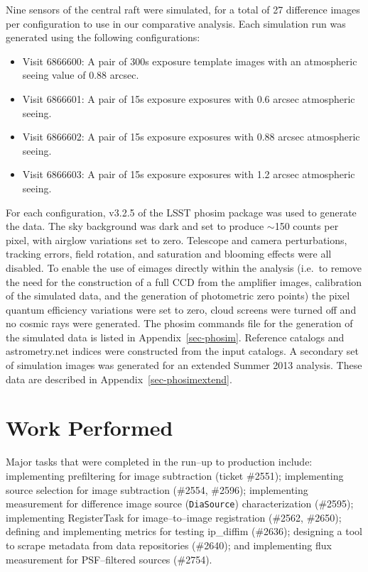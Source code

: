 \documentclass[prd, nofootinbib, floatfix, 11pt,tightenlines,times]{article}
\begin{document}
Nine sensors of the central raft were simulated, for a total of 27
difference images per configuration to use in our comparative
analysis.  Each simulation run was generated using the following
configurations:
\begin{itemize}
\item Visit 6866600: A pair of 300s exposure template images with
  an atmospheric seeing value of 0.88 arcsec.
\item Visit 6866601: A pair of 15s exposure exposures with 0.6
 arcsec atmospheric seeing.
\item Visit 6866602: A pair of 15s exposure exposures with 0.88
 arcsec atmospheric seeing.
\item Visit 6866603: A pair of 15s exposure exposures with 1.2
 arcsec atmospheric seeing.
\end{itemize}

For each configuration, v3.2.5 of the LSST phosim package was used to
generate the data. The sky background was dark and set to produce
$\sim$150 counts per pixel, with airglow variations set to
zero. Telescope and camera perturbations, tracking errors, field
rotation, and saturation and blooming effects were all disabled. To
enable the use of eimages directly within the analysis (i.e.\ to
remove the need for the construction of a full CCD from the amplifier
images, calibration of the simulated data, and the generation of
photometric zero points) the pixel quantum efficiency variations were
set to zero, cloud screens were turned off and no cosmic rays were
generated.  The phosim commands file for the generation of the
simulated data is listed in Appendix~\ref{sec-phosim}.  Reference
catalogs and astrometry.net indices were constructed from the input
catalogs.  A secondary set of simulation images was generated for an
extended Summer 2013 analysis.  These data are described in
Appendix~\ref{sec-phosimextend}.

\section{Work Performed}

Major tasks that were completed in the run--up to production include:
implementing prefiltering for image subtraction (ticket \#2551);
implementing source selection for image subtraction (\#2554, \#2596);
implementing measurement for difference image source ({\tt DiaSource})
characterization (\#2595); implementing RegisterTask for
image--to--image registration (\#2562, \#2650); defining and
implementing metrics for testing ip\_diffim (\#2636); designing a tool
to scrape metadata from data repositories (\#2640); and implementing
flux measurement for PSF--filtered sources (\#2754).
\end{document}
